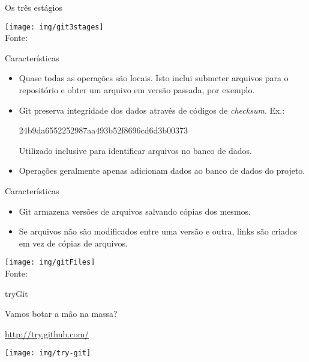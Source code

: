 \documentclass[a4paper]{beamer}
\begin{document}
\begin{frame}{Os três estágios}
\begin{center}
\texttt{[image: img/git3stages]}\\
{\scriptsize Fonte: \cite{proGit}}
\end{center}
\end{frame}

\begin{frame}{Características}

\begin{itemize}[<+->]
\item Quase todas as operações são locais. Isto inclui submeter arquivos para o repositório e obter um arquivo em versão passada, por exemplo.
\item Git preserva integridade dos dados através de códigos de \textit{checksum}. Ex.:
\begin{center}
24b9da6552252987aa493b52f8696cd6d3b00373
\end{center}
Utilizado inclusive para identificar arquivos no banco de dados.
\item Operações geralmente apenas adicionam dados ao banco de dados do projeto.
\end{itemize}

\end{frame}

\begin{frame}{Características}

\begin{itemize}
\item Git armazena versões de arquivos salvando cópias dos mesmos.
\item Se arquivos não são modificados entre uma versão e outra, links são criados em vez de cópias de arquivos.
\end{itemize}

\begin{center}
\texttt{[image: img/gitFiles]}\\
{\scriptsize Fonte: \cite{proGit}}
\end{center}

\end{frame}

\begin{frame}{tryGit}

Vamos botar a mão na massa?
\begin{center}
\url{http://try.github.com/}
\end{center}

\begin{center}
\texttt{[image: img/try-git]}
\end{center}

\end{frame}
\end{document}
